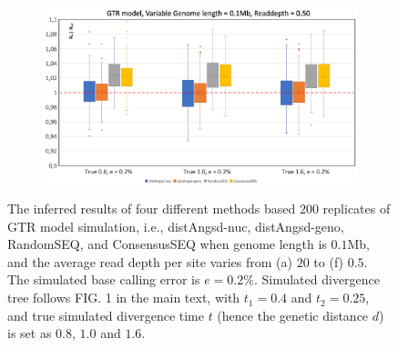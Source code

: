\documentclass{article}
\begin{document}
\begin{figure}[h]
\begin{subfigure}[b]{0.475\textwidth}
         \caption{}
         \label{fig:GTRRD075_01Mb}
     \end{subfigure}
     \begin{subfigure}[b]{0.475\textwidth}
         \centering
         \includegraphics[width=\textwidth]{GTRRD05_01Mb.png}
         \caption{}
         \label{fig:GTRRD05_01Mb}
     \end{subfigure}
    \vspace{0.5cm}
    \caption{The inferred results of four different methods based $200$ replicates of GTR model simulation, i.e., distAngsd-nuc, distAngsd-geno, RandomSEQ, and ConsensusSEQ when genome length is $0.1$Mb, and the average read depth per site varies from (a) $20$ to (f) $0.5$. The simulated base calling error is $e =0.2\%$. Simulated divergence tree follows FIG. 1 in the main text, with $t_1=0.4$ and $t_2 = 0.25$, and true simulated divergence time $t$ (hence the genetic distance $d$) is set as $0.8$, $1.0$ and $1.6$.}
    \label{fig:GTR01Mb}
\end{figure}
\end{document}
